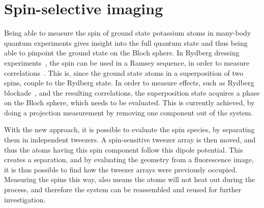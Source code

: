 \chapter{Spin-selective imaging}%
\label{ch:spin_resolved}


Being able to measure the spin of ground state potassium atoms in many-body quantum experiments gives insight into the full quantum state and thus being able to pinpoint the ground state on the Bloch sphere. In Rydberg dressing experiments~\cite{Zeiher2016, Borish2020}, the spin can be used in a Ramsey sequence, in order to measure correlations~\cite{Boll2016, Zeiher2017}.
This is, since the ground state atoms in a superposition of two spins, couple to the Rydberg state. In order to measure effects, such as Rydberg blockade~\cite{Urban2009}, and the resulting correlations, the superposition state acquires a phase on the Bloch sphere, which needs to be evaluated. This is currently achieved, by doing a projection measurement by removing one component out of the system.

With the new approach, it is possible to evaluate the spin species, by separating them in independent tweezers. A spin-sensitive tweezer array is then moved, and thus the atoms having this spin component follow this dipole potential. This creates a separation, and by evaluating the geometry from a fluorescence image, it is thus possible to find how the tweezer arrays were previously occupied. Measuring the spins this way, also means the atoms will not heat out during the process, and therefore the system can be reassembled and reused for further investigation.

